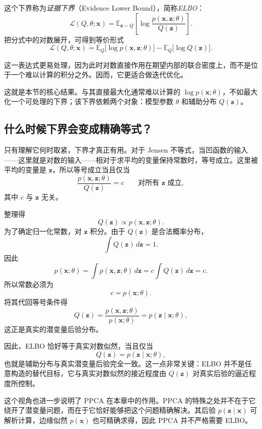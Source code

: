 这个下界称为\emph{证据下界}（Evidence Lower Bound），简称\emph{ELBO}：
\[
\mathcal{L}(Q,\theta;\mathbf{x})
=
\mathbb{E}_{\mathbf{z}\sim Q}
\!\left[
\log
\frac{p(\mathbf{x},\mathbf{z};\theta)}{Q(\mathbf{z})}
\right].
\]
把分式中的对数展开，可得到等价形式
\[
\mathcal{L}(Q,\theta;\mathbf{x})
=
\mathbb{E}_{Q}\big[\log p(\mathbf{x},\mathbf{z};\theta)\big]
-
\mathbb{E}_{Q}\big[\log Q(\mathbf{z})\big].
\]

这一表达式更易处理，因为此时对数直接作用在期望内部的联合密度上，而不是位于一个难以计算的积分之外。因而，它更适合做迭代优化。

这就是本节的核心结果。与其直接最大化通常难以计算的 \(\log p(\mathbf{x};\theta)\)，不如最大化一个可处理的下界；该下界依赖两个对象：模型参数 \(\theta\) 和辅助分布 \(Q(\mathbf{z})\)。

\subsection{什么时候下界会变成精确等式？}

只有理解它何时取紧，下界才真正有用。对于 Jensen 不等式，当凹函数的输入——这里就是对数的输入——相对于求平均的变量保持常数时，等号成立。这里被平均的变量是 \(\mathbf{z}\)，所以等号成立当且仅当
\[
\frac{p(\mathbf{x},\mathbf{z};\theta)}{Q(\mathbf{z})}
=
c
\qquad
\text{对所有 }\mathbf{z}\text{ 成立},
\]
其中 \(c\) 与 \(\mathbf{z}\) 无关。

整理得
\[
Q(\mathbf{z})\propto p(\mathbf{x},\mathbf{z};\theta).
\]
为了确定归一化常数，对 \(\mathbf{z}\) 积分。由于 \(Q(\mathbf{z})\) 是合法概率分布，
\[
\int Q(\mathbf{z})\,d\mathbf{z}=1.
\]
因此
\[
p(\mathbf{x};\theta)
=
\int p(\mathbf{x},\mathbf{z};\theta)\,d\mathbf{z}
=
c\int Q(\mathbf{z})\,d\mathbf{z}
=
c.
\]
所以常数必须为
\[
c=p(\mathbf{x};\theta).
\]
将其代回等号条件得
\[
Q(\mathbf{z})
=
\frac{p(\mathbf{x},\mathbf{z};\theta)}{p(\mathbf{x};\theta)}
=
p(\mathbf{z}\mid\mathbf{x};\theta),
\]
这正是真实的潜变量后验分布。

因此，ELBO 恰好等于真实对数似然，当且仅当
\[
Q(\mathbf{z})=p(\mathbf{z}\mid\mathbf{x};\theta),
\]
也就是辅助分布与真实潜变量后验完全一致。这一点非常关键：ELBO 并不是任意构造的替代目标，它与真实对数似然的接近程度由 \(Q(\mathbf{z})\) 对真实后验的逼近程度所控制。

这个视角也进一步说明了 PPCA 在本章中的作用。PPCA 的特殊之处并不在于它绕开了潜变量问题，而在于它恰好能够把这个问题精确解决。其后验 \(p(\mathbf{z}\mid\mathbf{x})\) 可解析计算，边缘似然 \(p(\mathbf{x})\) 也可精确求得，因此 PPCA 并不严格需要 ELBO。

